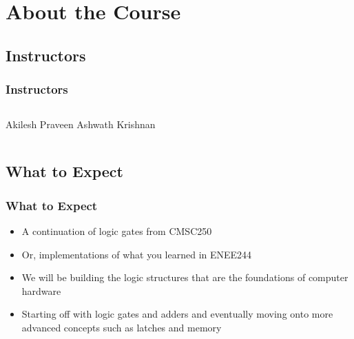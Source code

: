 \documentclass{beamer}
\begin{document}
    \section{About the Course}
    
        \subsection{Instructors}
        
            \begin{frame}
                \frametitle{Instructors}
                \begin{columns}
                    \centering
                    Akilesh Praveen
                    \centering
                    Ashwath Krishnan
                    \end{columns}
            \end{frame}
            
        \subsection{What to Expect}
        
            \begin{frame}
                \frametitle{What to Expect}
                    \begin{itemize}
                        \item A continuation of logic gates from CMSC250
                        \item Or, implementations of what you learned in ENEE244
                        \item We will be building the logic structures that are the foundations of computer hardware
                        \item Starting off with logic gates and adders and eventually moving onto more advanced concepts such as latches and memory
                    \end{itemize}
            \end{frame}
            
\end{document}
